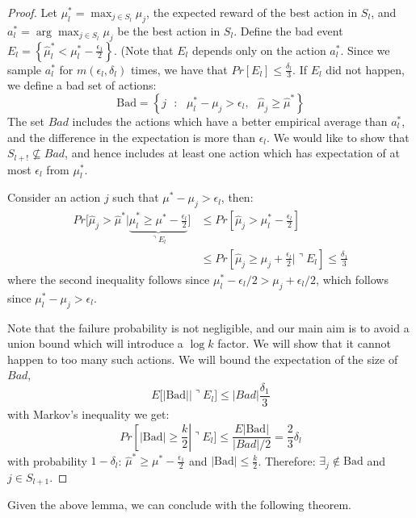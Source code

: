 \begin{proof}
Let $\mu^*_l=\max_{j\in S_l} \mu_j$, the expected reward of the best action in $S_l$, and $a^*_l=\arg\max_{j\in S_l} \mu_j$ be the best action in $S_l$.
Define the bad event $E_{l}=\left\{\hat{\mu}^{*}_l<\mu^{*}_l-\frac{\epsilon_{1}}{2}\right\}$. (Note that $E_l$ depends only on the action $a^*_l$. Since we sample $a^*_l$ for $m(\epsilon_l,\delta_l)$ times, we have that $Pr\left[E_{l}\right]\le\frac{\delta_{l}}{3}$. If $E_{l}$ did not happen, we define a bad set of actions:
\[
\text{Bad}=\left\{ j\text{ }:\text{ }\mu^{*}_l-\mu_{j}>\epsilon_{l},\text{ }\hat{\mu}_{j}\ge\hat{\mu}^{*}\right\}
\]
The set $Bad$ includes the actions which have a better empirical average than $a_l^*$, and the difference in the expectation is more than $\epsilon_l$. We would like to show that $S_{l+!}\not\subseteq Bad$, and hence includes at least one action which has expectation of at most $\epsilon_l$ from $\mu^*_l$.


Consider an action $j$ such that $\mu^*-\mu_j > \epsilon_l$, then:
\begin{align*}
Pr[\hat{\mu}_{j}>
\hat{\mu}^{*}|\underbrace{\hat{\mu}^{*}_l\ge\mu^{*}-\frac{\epsilon_{l}}{2}}_{\urcorner
E_{l}}\big] & \le Pr[\hat{\mu}_{j}> \mu^{*}_l-\frac{\epsilon_{l}}{2}]\\
&\leq
Pr[\hat{\mu}_{j}\ge\mu_{j}+\frac{\epsilon_{l}}{2}|\urcorner E_{l}]
\le  \frac{\delta_{1}}{3}
\end{align*}
where the second inequality follows since $\mu^*_l-\epsilon_l/2 > \mu_j+\epsilon_l/2$, which follows since $\mu^*_l-\mu_j>\epsilon_l$.



Note that the failure probability is not negligible, and our main aim is to avoid a union bound which will introduce a $\log k$ factor. We will show that it cannot happen to too many such actions. We will bound the expectation of the size of $Bad$,
\[
E[|\text{Bad}||\urcorner E_{l}]\le |Bad|\frac{\delta_{1}}{3}
\]
 with Markov's inequality we get:
\[
Pr\left[\left|\text{Bad}\right|\ge\frac{k}{2}\right|\urcorner E_{l}]
 \le  \frac{E\left|\text{Bad}\right|}{|Bad|/2}
  =  \frac{2}{3}\delta_{l}
\]
 with probability $1-\delta_{l}$: $\hat{\mu}^{*}\ge\mu^{*}-\frac{\epsilon_{1}}{2}$ and $\left|\text{Bad}\right|\le\frac{k}{2}$. Therefore: $\exists_{j}\notin\text{Bad}$ and $j\in S_{l+1}$.
\end{proof}

Given the above lemma, we can conclude with the following theorem.


